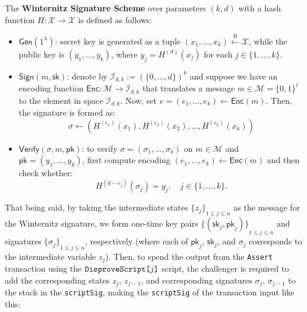 \documentclass{iacrtrans}
\begin{document}
\begin{definition}
  The \textbf{Winternitz Signature Scheme} over parameters $(k,d)$
  with a hash function $H: \mathcal{X} \to \mathcal{X}$ is defined as follows:
  \begin{itemize}
    \item $\mathsf{Gen}(1^{\lambda})$: secret key is generated as a tuple
      $(x_1,\dots,x_k) \xleftarrow{R} \mathcal{X}$, while the public key is
      $(y_1,\dots,y_k)$, where $y_j = H^{(d)}(x_j)$ for each
      $j \in \{1,\dots,k\}$.
    \item $\mathsf{Sign}(m,\mathsf{sk})$: denote by
      $\mathcal{I}_{d,k} := {(\{0,\dots,d\})}^k$ and suppose we have an encoding
      function $\mathsf{Enc}: \mathcal{M} \to \mathcal{I}_{d,k}$ that
      translates a message
      $m \in \mathcal{M} = {\{0,1\}}^{\ell}$ to the element in space
      $\mathcal{I}_{d,k}$. Now, set
      $e = (e_1,\dots,e_k) \gets \mathsf{Enc}(m)$. Then, the signature is
      formed as:
      \begin{equation*}
        \sigma \gets ({H}^{(e_1)}(x_1), H^{(e_2)}(x_2), \dots, H^{(e_k)}(x_k))
      \end{equation*}
    \item $\mathsf{Verify}(\sigma,m,\mathsf{pk})$: to verify
      $\sigma = (\sigma_1,\dots,\sigma_k)$ on $m \in \mathcal{M}$ and
      $\mathsf{pk}=(y_1,\dots,y_k)$, first compute encoding
      $(e_1,\dots,e_k) \gets \mathsf{Enc}(m)$ and then check whether:
      \begin{equation*}
        H^{(d-e_j)}(\sigma_j) = y_j, \quad j \in \{1,\dots,k\}.
      \end{equation*}
  \end{itemize}
\end{definition}

That being said, by taking the intermediate states
${\{z_j\}}_{1 \leq j \leq n}$ as the message for the Winternitz signature, we
form one-time key pairs
${\{(\mathsf{sk}_j,\mathsf{pk}_j)\}}_{1 \leq j \leq n}$ and signatures
${\{\sigma_j\}}_{1 \leq j \leq n}$, respectively (where each of
  $\mathsf{pk}_j$, $\mathsf{sk}_j$, and $\sigma_j$ corresponds to the
intermediate variable $z_j$). Then, to spend the output from the
\texttt{Assert} transaction using the $\texttt{DisproveScript[\text{$j$}]}$
script, the challenger is required to add the corresponding states
$z_j$, $z_{j-1}$, and corresponding signatures $\sigma_j$,
$\sigma_{j-1}$ to the stack in the \texttt{scriptSig}, making the
\texttt{scriptSig} of the transaction input like this:
\end{document}
